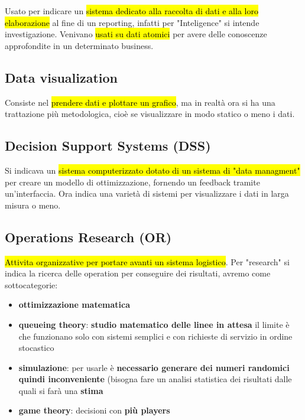 Usato per indicare un \hl{sistema dedicato alla raccolta di dati e alla loro elaborazione} al fine di un reporting, infatti per "Inteligence" si intende investigazione.
Venivano \hl{usati su dati atomici} per avere delle conoscenze approfondite in un determinato business.


\subsection{Data visualization}

Consiste nel \hl{prendere dati e plottare un grafico}, ma in realtà ora si ha una trattazione più metodologica, cioè se visualizzare in  modo statico o meno i dati.


\subsection{Decision Support Systems (DSS)}

Si indicava un \hl{sistema computerizzato dotato di un sistema di "data managment"} per creare un modello di ottimizzazione, fornendo un feedback tramite un'interfaccia. Ora indica una varietà di sistemi per visualizzare i dati in larga misura o meno.


\subsection{Operations Research (OR)}

\hl{Attivita organizzative per portare avanti un sistema logistico}. Per "research" si indica la ricerca delle operation per conseguire dei risultati, avremo come sottocategorie:
\begin{itemize}
	\item \textbf{ottimizzazione matematica}
	\item \textbf{queueing theory}: \textbf{studio matematico delle linee in attesa}  il limite è che funzionano solo con sistemi semplici e con richieste di servizio in ordine stocastico
	\item \textbf{simulazione}: per usarle è \textbf{necessario generare dei numeri randomici}  \textbf{quindi  inconveniente} (bisogna fare un analisi statistica dei risultati dalle quali si farà una \textbf{stima} 
	\item \textbf{game theory}: decisioni con \textbf{più players}
\end{itemize}


